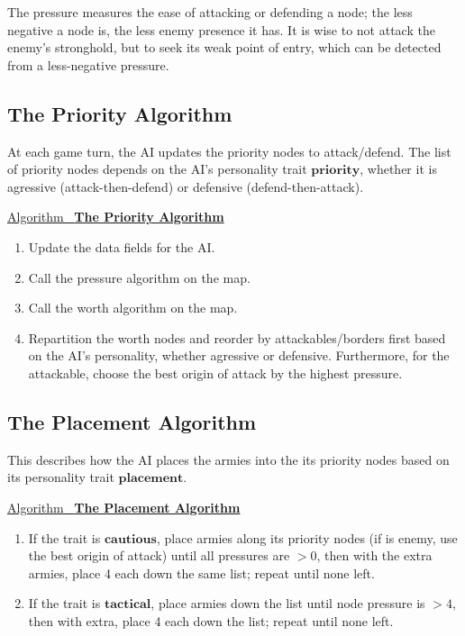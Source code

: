 \documentclass[12pt]{article}  %
\newcommand{\algtitle}[1]{\underline{Algorithm \ {\bf #1}} \vspace*{1mm}\\}
\begin{document}
The pressure measures the ease of attacking or defending a node; the less negative a node is, the less enemy presence it has. It is wise to not attack the enemy's stronghold, but to seek its weak point of entry, which can be detected from a less-negative pressure.


\subsection{The Priority Algorithm}
At each game turn, the AI updates the priority nodes to attack/defend. The list of priority nodes depends on the AI's personality trait $\textbf{priority}$, whether it is agressive (attack-then-defend) or defensive (defend-then-attack).

\algtitle{The Priority Algorithm}
\begin{enumerate}
	\item Update the data fields for the AI.
	\item Call the pressure algorithm on the map.
	\item Call the worth algorithm on the map.
	\item Repartition the worth nodes and reorder by attackables/borders first based on the AI's personality, whether agressive or defensive. Furthermore, for the attackable, choose the best origin of attack by the highest pressure.
\end{enumerate}







\subsection{The Placement Algorithm}
This describes how the AI places the armies into the its priority nodes based on its personality trait $\textbf{placement}$.

\algtitle{The Placement Algorithm}
\begin{enumerate}
	\item If the trait is $\textbf{cautious}$, place armies along its  priority nodes (if is enemy, use the best origin of attack) until all pressures are $>0$, then with the extra armies, place 4 each down the same list; repeat until none left.
	\item If the trait is $\textbf{tactical}$, place armies down the list until node pressure is $>4$, then with extra, place 4 each down the list; repeat until none left.
\end{enumerate}
\end{document}

